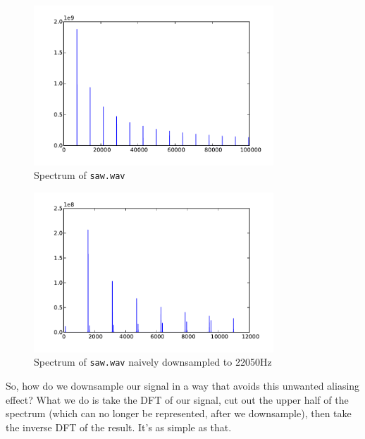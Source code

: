 \begin{figure}[ht]\caption{Spectrum of \texttt{saw.wav}}\label{sawspec}\centering\includegraphics[width=90mm]{sawspec}\end{figure}

\begin{figure}[ht]\caption{Spectrum of \texttt{saw.wav} naively downsampled to 22050Hz}\label{sawspecdown}\centering\includegraphics[width=90mm]{sawspecdown}\end{figure}

So, how do we downsample our signal in a way that avoids this unwanted aliasing effect? What we do is take the DFT of our signal, cut out the upper half of the spectrum (which can no longer be represented, after we downsample), then take the inverse DFT of the result. It's as simple as that.

